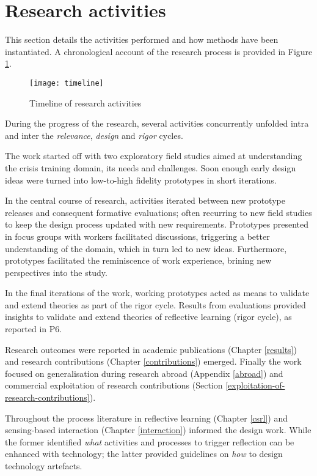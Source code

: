 \section{Research activities}\label{research-activities}

This section details the activities performed and how methods have been instantiated. A chronological account of the research process is provided in Figure \ref{fig:research-activities}.
\begin{figure}
	[p] \centering 
	\texttt{[image: timeline]} \caption{Timeline of research activities} \label{fig:research-activities} 
\end{figure}

During the progress of the research, several activities concurrently unfolded intra and inter the \emph{relevance}, \emph{design} and \emph{rigor} cycles.

The work started off with two exploratory field studies aimed at understanding the crisis training domain, its needs and challenges. Soon enough early design ideas were turned into low-to-high fidelity prototypes in short iterations. 

In the central course of research, activities iterated between new prototype releases and consequent formative evaluations; often recurring to new field studies to keep the design process updated with new requirements. Prototypes presented in focus groups with workers facilitated discussions, triggering a better understanding of the domain, which in turn led to new ideas. Furthermore, prototypes facilitated the reminiscence of work experience, brining new perspectives into the study.

In the final iterations of the work, working prototypes acted as means to validate and extend theories as part of the rigor cycle. Results from evaluations provided insights to validate and extend theories of reflective learning (rigor cycle), as reported in P6. 

Research outcomes were reported in academic publications (Chapter \ref{results}) and research contributions (Chapter \ref{contributions}) emerged. Finally the work focused on generalisation during research abroad (Appendix \ref{abroad}) and commercial exploitation of research contributions (Section \ref{exploitation-of-research-contributions}).

Throughout the process literature in reflective learning (Chapter \ref{csrl}) and sensing-based interaction (Chapter \ref{interaction}) informed the design work. While the former identified \emph{what} activities and processes to trigger reflection can be enhanced with technology; the latter provided guidelines on \emph{how} to design technology artefacts.

